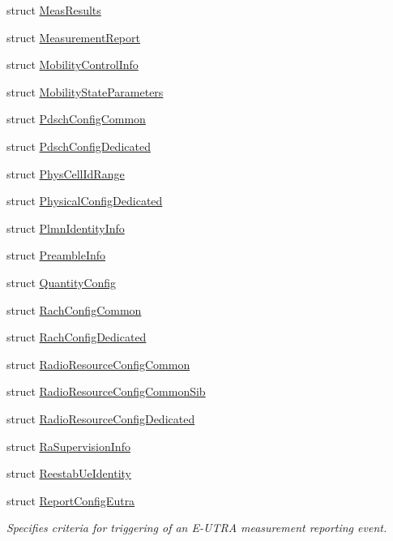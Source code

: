 \begin{DoxyCompactItemize}
\item 
struct \hyperlink{structns3_1_1LteRrcSap_1_1MeasResults}{Meas\+Results}
\item 
struct \hyperlink{structns3_1_1LteRrcSap_1_1MeasurementReport}{Measurement\+Report}
\item 
struct \hyperlink{structns3_1_1LteRrcSap_1_1MobilityControlInfo}{Mobility\+Control\+Info}
\item 
struct \hyperlink{structns3_1_1LteRrcSap_1_1MobilityStateParameters}{Mobility\+State\+Parameters}
\item 
struct \hyperlink{structns3_1_1LteRrcSap_1_1PdschConfigCommon}{Pdsch\+Config\+Common}
\item 
struct \hyperlink{structns3_1_1LteRrcSap_1_1PdschConfigDedicated}{Pdsch\+Config\+Dedicated}
\item 
struct \hyperlink{structns3_1_1LteRrcSap_1_1PhysCellIdRange}{Phys\+Cell\+Id\+Range}
\item 
struct \hyperlink{structns3_1_1LteRrcSap_1_1PhysicalConfigDedicated}{Physical\+Config\+Dedicated}
\item 
struct \hyperlink{structns3_1_1LteRrcSap_1_1PlmnIdentityInfo}{Plmn\+Identity\+Info}
\item 
struct \hyperlink{structns3_1_1LteRrcSap_1_1PreambleInfo}{Preamble\+Info}
\item 
struct \hyperlink{structns3_1_1LteRrcSap_1_1QuantityConfig}{Quantity\+Config}
\item 
struct \hyperlink{structns3_1_1LteRrcSap_1_1RachConfigCommon}{Rach\+Config\+Common}
\item 
struct \hyperlink{structns3_1_1LteRrcSap_1_1RachConfigDedicated}{Rach\+Config\+Dedicated}
\item 
struct \hyperlink{structns3_1_1LteRrcSap_1_1RadioResourceConfigCommon}{Radio\+Resource\+Config\+Common}
\item 
struct \hyperlink{structns3_1_1LteRrcSap_1_1RadioResourceConfigCommonSib}{Radio\+Resource\+Config\+Common\+Sib}
\item 
struct \hyperlink{structns3_1_1LteRrcSap_1_1RadioResourceConfigDedicated}{Radio\+Resource\+Config\+Dedicated}
\item 
struct \hyperlink{structns3_1_1LteRrcSap_1_1RaSupervisionInfo}{Ra\+Supervision\+Info}
\item 
struct \hyperlink{structns3_1_1LteRrcSap_1_1ReestabUeIdentity}{Reestab\+Ue\+Identity}
\item 
struct \hyperlink{structns3_1_1LteRrcSap_1_1ReportConfigEutra}{Report\+Config\+Eutra}
\begin{DoxyCompactList}\small\item\em Specifies criteria for triggering of an E-\/\+U\+T\+RA measurement reporting event. \end{DoxyCompactList}\item 

\end{DoxyCompactItemize}
